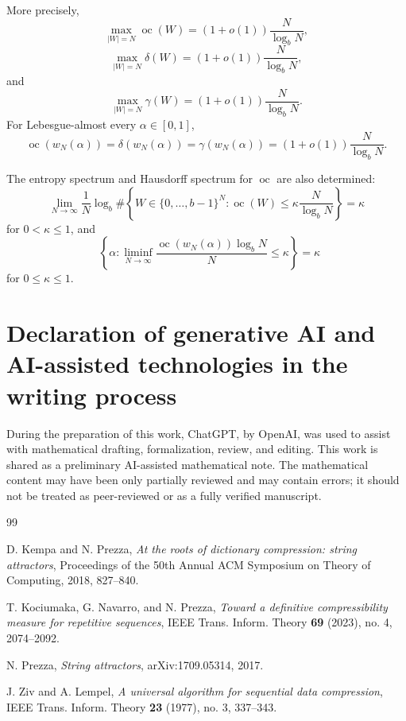 \documentclass[11pt]{amsart}
\DeclareMathOperator{\oc}{oc}
\DeclareMathOperator{\dimH}{dim_H}
\begin{document}
More precisely,
\[
\max_{|W|=N}\oc(W)
=
(1+o(1))\frac{N}{\log_b N},
\]
\[
\max_{|W|=N}\delta(W)
=
(1+o(1))\frac{N}{\log_b N},
\]
and
\[
\max_{|W|=N}\gamma(W)
=
(1+o(1))\frac{N}{\log_b N}.
\]
For Lebesgue-almost every $\alpha\in[0,1]$,
\[
\oc(w_N(\alpha))
=
\delta(w_N(\alpha))
=
\gamma(w_N(\alpha))
=
(1+o(1))\frac{N}{\log_b N}.
\]

The entropy spectrum and Hausdorff spectrum for $\oc$ are also determined:
\[
\lim_{N\to\infty}
\frac1N
\log_b
\#\left\{
W\in\{0,\ldots,b-1\}^N:
\oc(W)\leq
\kappa\frac{N}{\log_b N}
\right\}
=
\kappa
\]
for $0<\kappa\leq1$, and
\[
\dimH
\left\{
\alpha:
\liminf_{N\to\infty}
\frac{\oc(w_N(\alpha))\log_b N}{N}
\leq\kappa
\right\}
=
\kappa
\]
for $0\leq\kappa\leq1$.

\section*{Declaration of generative AI and AI-assisted technologies in the writing process}

During the preparation of this work, ChatGPT, by OpenAI, was used to assist with mathematical drafting, formalization, review, and editing. This work is shared as a preliminary AI-assisted mathematical note. The mathematical content may have been only partially reviewed and may contain errors; it should not be treated as peer-reviewed or as a fully verified manuscript.

\begin{thebibliography}{99}

D. Kempa and N. Prezza,
\emph{At the roots of dictionary compression: string attractors},
Proceedings of the 50th Annual ACM Symposium on Theory of Computing, 2018, 827--840.

T. Kociumaka, G. Navarro, and N. Prezza,
\emph{Toward a definitive compressibility measure for repetitive sequences},
IEEE Trans. Inform. Theory \textbf{69} (2023), no. 4, 2074--2092.

N. Prezza,
\emph{String attractors},
arXiv:1709.05314, 2017.

J. Ziv and A. Lempel,
\emph{A universal algorithm for sequential data compression},
IEEE Trans. Inform. Theory \textbf{23} (1977), no. 3, 337--343.

\end{thebibliography}
\end{document}
